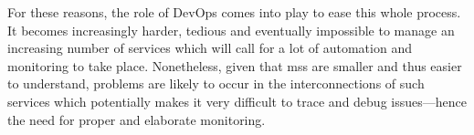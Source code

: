 For these reasons, the role of DevOps comes into play to ease this whole process.
It becomes increasingly harder, tedious and eventually impossible to
manage an increasing number of services which will call for a lot of
automation and monitoring to take place. Nonetheless, given that \glspl{ms} are
smaller and thus easier to understand, problems are likely to occur in
the interconnections of such services which potentially makes it very
difficult to trace and debug issues---hence the need for proper and
elaborate monitoring.


